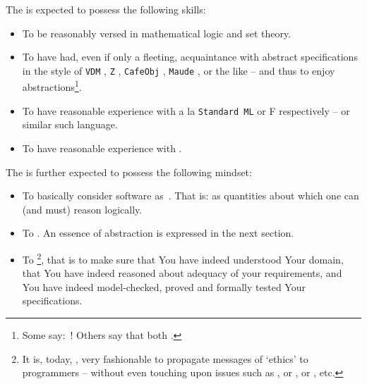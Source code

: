 \label{Prerequisite Skills}

\begynd
\pind The  is expected to possess the
      following skills:
\afslut
\begin{itemize}
\item To be reasonably versed in  mathematical logic
  and set theory.
\item To have had, even if only a  fleeting, acquaintance with abstract
  specifications in the style of
  \texttt{VDM} \citevdm,
  \texttt{Z} \citez,
  \texttt{CafeObj} \citecafeobj, 
  \texttt{Maude} \cite{maude-primer,maude-manual}, or the like -- and thus
  to enjoy abstractions\footnote{Some say: \,! Others say that both .}.
\item To have reasonable experience with  a
      la \texttt{Standard ML} or \textsf{F}
      \cite{MilnerTofte,Harper,MRHansen+HRischel} respectively
      \cite{Hansen+Rischel} -- or similar such language.
    \item To have  reasonable experience with 
      \cite{Hoa78,Hoare85,Hoare85+2004,Roscoe97,Schneider99}.
\end{itemize}
\noindent
\begynd
\pind The  is further expected to possess
      the following mindset:
\afslut
\begin{itemize}
\item To basically consider software as\ . That is: as quantities about which one can (and must) reason logically.
  \item To . An essence of
  abstraction is expressed in the next section.

\item To \footnote{It is, today, \todaytime, 
    very fashionable to propagate messages of `ethics' to programmers
    -- without even touching upon issues such as , or
    ,
    or , etc.}, that is to make sure that You have 
    indeed understood Your domain, that You  have indeed reasoned
    about adequacy of your requirements, and  You have indeed
    model-checked, proved and formally tested Your  
    specifications.
\end{itemize}

